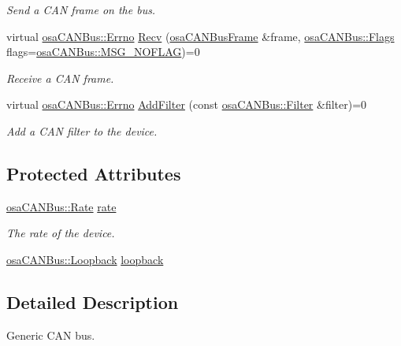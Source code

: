 \begin{DoxyCompactItemize}
\begin{DoxyCompactList}\small\item\em Send a C\+A\+N frame on the bus. \end{DoxyCompactList}\item 
virtual \hyperlink{classosa_c_a_n_bus_a6fa3e95ec4c36932d0640e40e0748fde}{osa\+C\+A\+N\+Bus\+::\+Errno} \hyperlink{classosa_c_a_n_bus_a8c095ec60f161eaf8f014b039f62faab}{Recv} (\hyperlink{classosa_c_a_n_bus_frame}{osa\+C\+A\+N\+Bus\+Frame} \&frame, \hyperlink{classosa_c_a_n_bus_a74fe35c6059237887431f3ccece7b21b}{osa\+C\+A\+N\+Bus\+::\+Flags} flags=\hyperlink{classosa_c_a_n_bus_a74fe35c6059237887431f3ccece7b21ba30f701fa6e0dba6e274540941ccd3978}{osa\+C\+A\+N\+Bus\+::\+M\+S\+G\+\_\+\+N\+O\+F\+L\+A\+G})=0
\begin{DoxyCompactList}\small\item\em Receive a C\+A\+N frame. \end{DoxyCompactList}\item 
virtual \hyperlink{classosa_c_a_n_bus_a6fa3e95ec4c36932d0640e40e0748fde}{osa\+C\+A\+N\+Bus\+::\+Errno} \hyperlink{classosa_c_a_n_bus_abc63dc1654ae14c4e0705c01cd3a6405}{Add\+Filter} (const \hyperlink{classosa_c_a_n_bus_1_1_filter}{osa\+C\+A\+N\+Bus\+::\+Filter} \&filter)=0
\begin{DoxyCompactList}\small\item\em Add a C\+A\+N filter to the device. \end{DoxyCompactList}\end{DoxyCompactItemize}
\subsection*{Protected Attributes}
\begin{DoxyCompactItemize}
\item 
\hyperlink{classosa_c_a_n_bus_ae977dbc0e1c16772395408c8e018fe6c}{osa\+C\+A\+N\+Bus\+::\+Rate} \hyperlink{classosa_c_a_n_bus_a4ff86a9ecf19161b1f34666888e0a331}{rate}
\begin{DoxyCompactList}\small\item\em The rate of the device. \end{DoxyCompactList}\item 
\hyperlink{classosa_c_a_n_bus_a992406c83a336e95fb4a09b0b13df786}{osa\+C\+A\+N\+Bus\+::\+Loopback} \hyperlink{classosa_c_a_n_bus_a724e9c478dd48908882e29f189d98968}{loopback}
\end{DoxyCompactItemize}


\subsection{Detailed Description}
Generic C\+A\+N bus. 

